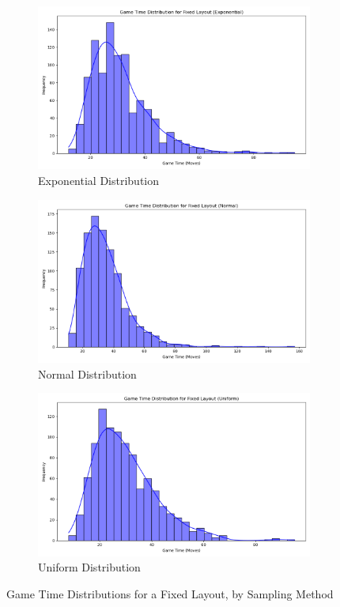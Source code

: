 \documentclass[12pt]{report}
\begin{document}
	\begin{figure}[h]
		\centering
		\begin{subfigure}[b]{0.32\textwidth}
			\includegraphics[width=\linewidth]{../withLength/FinalSampling/full_distribution_exponential}
			\caption{Exponential Distribution}
		\end{subfigure}
		\hfill
		\begin{subfigure}[b]{0.32\textwidth}
			\includegraphics[width=\linewidth]{../withLength/FinalSampling/full_distribution_normal}
			\caption{Normal Distribution}
		\end{subfigure}
		\hfill
		\begin{subfigure}[b]{0.32\textwidth}
			\includegraphics[width=\linewidth]{../withLength/FinalSampling/full_distribution_uniform}
			\caption{Uniform Distribution}
		\end{subfigure}
		\caption{Game Time Distributions for a Fixed Layout, by Sampling Method}
	\end{figure}
\end{document}
